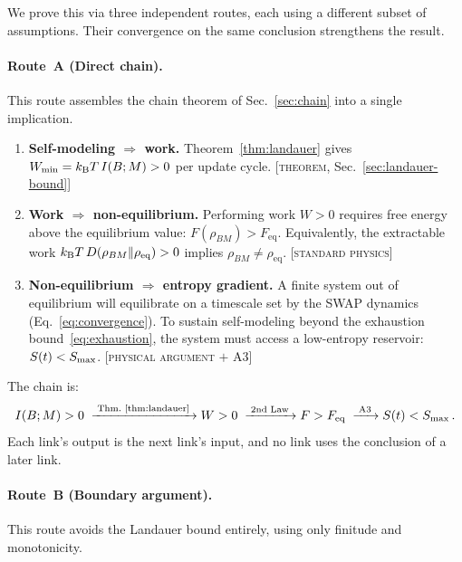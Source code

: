 \noindent
We prove this via three independent routes, each using a different
subset of assumptions.  Their convergence on the same conclusion
strengthens the result.

\paragraph{Route~A (Direct chain).}
This route assembles the chain theorem of
Sec.~\ref{sec:chain} into a single implication.
\begin{enumerate}
  \item \textbf{Self-modeling $\boldsymbol{\Rightarrow}$ work.}
    Theorem~\ref{thm:landauer} gives
    $W_{\min} = k_{\mathrm{B}} T\,I(B;M) > 0$ per update cycle.
    \hfill[\textsc{theorem}, Sec.~\ref{sec:landauer-bound}]

  \item \textbf{Work $\boldsymbol{\Rightarrow}$ non-equilibrium.}
    Performing work $W > 0$ requires free energy above the
    equilibrium value: $F(\rho_{BM}) > F_{\mathrm{eq}}$.
    Equivalently, the extractable work
    $k_{\mathrm{B}} T\,D(\rho_{BM}\|\rho_{\mathrm{eq}}) > 0$ implies
    $\rho_{BM} \neq \rho_{\mathrm{eq}}$.
    \hfill[\textsc{standard physics}]

  \item \textbf{Non-equilibrium $\boldsymbol{\Rightarrow}$ entropy
    gradient.}
    A finite system out of equilibrium will equilibrate on a
    timescale set by the SWAP dynamics
    (Eq.~\eqref{eq:convergence}).  To sustain self-modeling beyond
    the exhaustion bound~\eqref{eq:exhaustion}, the system must
    access a low-entropy reservoir: $S(t) < S_{\max}$.
    \hfill[\textsc{physical argument} $+$ A3]
\end{enumerate}
The chain is:
\begin{equation}
  I(B;M) > 0
  \;\xrightarrow{\;\text{Thm.~\ref{thm:landauer}}\;}
  W > 0
  \;\xrightarrow{\;\text{2nd Law}\;}
  F > F_{\mathrm{eq}}
  \;\xrightarrow{\;\text{A3}\;}
  S(t) < S_{\max} \,.
  \label{eq:route-a}
\end{equation}
Each link's output is the next link's input, and no link uses the
conclusion of a later link.

\paragraph{Route~B (Boundary argument).}
This route avoids the Landauer bound entirely, using only finitude and
monotonicity.

